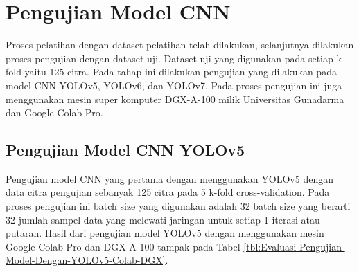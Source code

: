 \section{Pengujian Model CNN}
\hspace{1,2cm}
Proses pelatihan dengan dataset pelatihan telah dilakukan, selanjutnya dilakukan proses pengujian dengan dataset uji. Dataset uji yang digunakan pada setiap k-fold yaitu 125 citra. Pada tahap ini dilakukan pengujian yang dilakukan pada model CNN YOLOv5, YOLOv6, dan YOLOv7. Pada proses pengujian ini juga menggunakan mesin super komputer DGX-A-100 milik Universitas Gunadarma dan Google Colab Pro.

\subsection{Pengujian Model CNN YOLOv5}
\hspace{1,2cm}
Pengujian model CNN yang pertama dengan menggunakan YOLOv5 dengan data citra pengujian sebanyak 125 citra pada 5 k-fold cross-validation. Pada proses pengujian ini batch size yang digunakan adalah 32 batch size yang berarti 32 jumlah sampel data yang melewati jaringan untuk setiap 1 iterasi atau putaran. Hasil dari pengujian model YOLOv5 dengan menggunakan mesin Google Colab Pro dan DGX-A-100 tampak pada Tabel \ref{tbl:Evaluasi-Pengujian-Model-Dengan-YOLOv5-Colab-DGX}.


